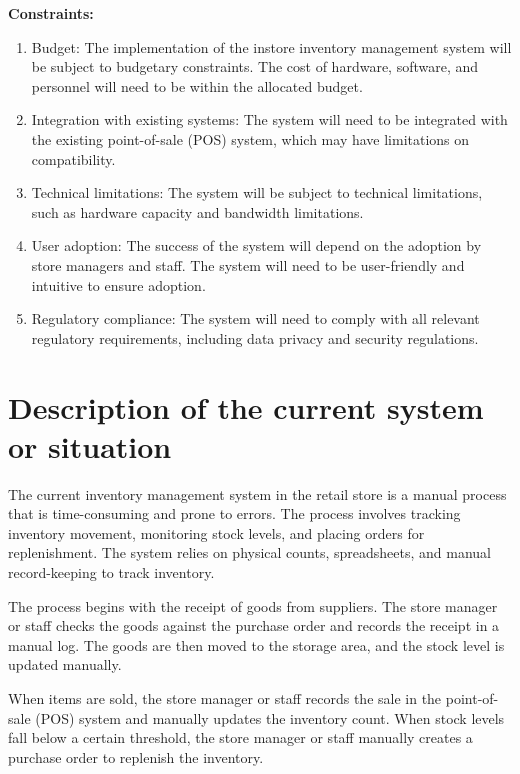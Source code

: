 \noindent
\textbf{Constraints:}
\begin{enumerate}
\item Budget: The implementation of the instore inventory management system will be subject to budgetary constraints. The cost of hardware, software, and personnel will need to be within the allocated budget.

\item Integration with existing systems: The system will need to be integrated with the existing point-of-sale (POS) system, which may have limitations on compatibility.

\item Technical limitations: The system will be subject to technical limitations, such as hardware capacity and bandwidth limitations.

\item User adoption: The success of the system will depend on the adoption by store managers and staff. The system will need to be user-friendly and intuitive to ensure adoption.

\item Regulatory compliance: The system will need to comply with all relevant regulatory requirements, including data privacy and security regulations.
\end{enumerate}

\section{Description of the current system or situation \label{Section::Descriptionofthecurrentsystemorsituation}}
The current inventory management system in the retail store is a manual process that is time-consuming and prone to errors. The process involves tracking inventory movement, monitoring stock levels, and placing orders for replenishment. The system relies on physical counts, spreadsheets, and manual record-keeping to track inventory.

The process begins with the receipt of goods from suppliers. The store manager or staff checks the goods against the purchase order and records the receipt in a manual log. The goods are then moved to the storage area, and the stock level is updated manually.

When items are sold, the store manager or staff records the sale in the point-of-sale (POS) system and manually updates the inventory count. When stock levels fall below a certain threshold, the store manager or staff manually creates a purchase order to replenish the inventory.

